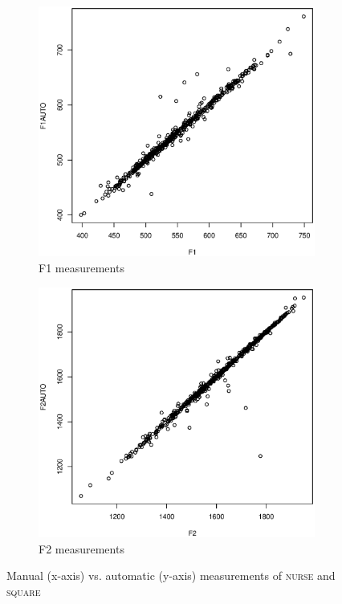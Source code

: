 		\begin{figure}
			
				\begin{subfigure}[b]{0.45\textwidth}
					
					\includegraphics[width=\textwidth]{figures/F1F1AUTO}
					\caption{F1 measurements}
				\end{subfigure}
				\begin{subfigure}[b]{0.45\textwidth}
					
					\includegraphics[width=\textwidth]{figures/F2F2AUTO}
					\caption{F2 measurements}
				\end{subfigure}
			\caption[Manual vs. automatic measurements (\textsc{nurse} and \textsc{square})]{Manual (x-axis) vs. automatic (y-axis) measurements of \textsc{nurse} and \textsc{square}}\label{fig.automatic.measurements}
		\end{figure}


